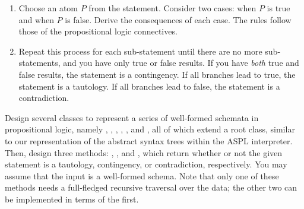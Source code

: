 
\begin{enumerate}
    \item Choose an atom $P$ from the statement. Consider two cases: when $P$ is true and when $P$ is false. Derive the consequences of each case. The rules follow those of the propositional logic connectives.
    \item Repeat this process for each sub-statement until there are no more sub-statements, and you have only true or false results. If you have \emph{both} true and false results, the statement is a contingency. If all branches lead to true, the statement is a tautology. If all branches lead to false, the statement is a contradiction. 
\end{enumerate}

Design several classes to represent a series of well-formed schemata in propositional logic, namely , , , , , and , all of which extend a root  class, similar to our representation of the abstract syntax trees within the ASPL interpreter. Then, design three methods: , , and , which return whether or not the given statement is a tautology, contingency, or contradiction, respectively. You may assume that the input is a well-formed schema. Note that only one of these methods needs a full-fledged recursive traversal over the data; the other two can be implemented in terms of the first.
